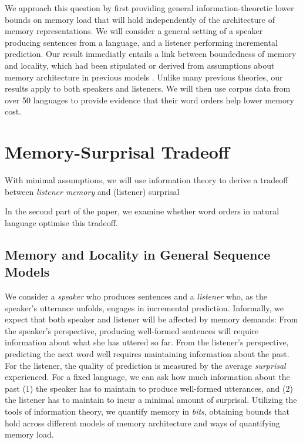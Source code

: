 \documentclass[11pt,letterpaper]{article}
\begin{document}
We approach this question by first providing general information-theoretic lower bounds on memory load that will hold independently of the architecture of memory representations.
We will consider a general setting of a speaker producing sentences from a language, and a listener performing incremental prediction.
Our result immediatly entails a link between boundedness of memory and locality, which had been stipulated or derived from assumptions about memory architecture in previous models \citep{gibson-linguistic-1998, lewis-activation-based-2005, futrell-noisy-context-2017}.
Unlike many previous theories, our results apply to both speakers and listeners.
We will then use corpus data from over 50 languages to provide evidence that their word orders help lower memory cost.


\section{Memory-Surprisal Tradeoff}

With minimal assumptions, we will use information theory to derive a tradeoff between \emph{listener memory} and (listener) surprisal

In the second part of the paper, we examine whether word orders in natural language optimise this tradeoff.


\subsection{Memory and Locality in General Sequence Models}

We consider a \emph{speaker} who produces sentences and a \emph{listener} who, as the speaker's utterance unfolds, engages in incremental prediction.
Informally, we expect that both speaker and listener will be affected by memory demands:
From the speaker's perspective, producing well-formed sentences will require information about what she has uttered so far.
From the listener's perspective, predicting the next word well requires maintaining information about the past.
For the listener, the quality of prediction is measured by the average \emph{surprisal} experienced.
For a fixed language, we can ask how much information about the past (1) the speaker has to maintain to produce well-formed utterances, and (2) the listener has to maintain to incur a minimal amount of surprisal.
Utilizing the tools of information theory, we quantify memory in \emph{bits}, obtaining bounds that hold across different models of memory architecture and ways of quantifying memory load.
\end{document}
